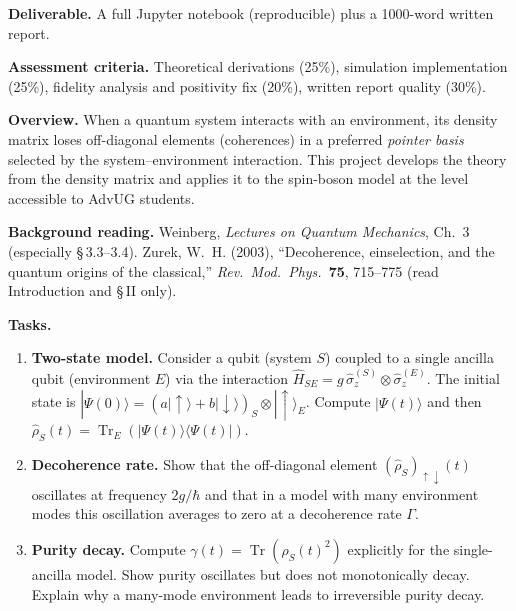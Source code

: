 \documentclass[11pt,a4paper]{article}
\begin{document}
\begin{tcolorbox}[ugprobbox, title={Project CJ1 --- Quantum State Tomography of a Qubit}]
\medskip\textbf{Deliverable.}
A full Jupyter notebook (reproducible) plus a 1000-word written report.

\medskip\textbf{Assessment criteria.}
Theoretical derivations (25\%), simulation implementation (25\%),
fidelity analysis and positivity fix (20\%), written report quality (30\%).
\end{tcolorbox}

\bigskip

\begin{tcolorbox}[ugprobbox, title={Project CJ2 --- Decoherence and the Pointer Basis}]

\textbf{Overview.}
When a quantum system interacts with an environment, its density matrix loses
off-diagonal elements (coherences) in a preferred \emph{pointer basis} selected
by the system--environment interaction.
This project develops the theory from the density matrix and applies it to
the spin-boson model at the level accessible to AdvUG students.

\medskip\textbf{Background reading.}
Weinberg, \textit{Lectures on Quantum Mechanics}, Ch.~3 (especially \S\,3.3--3.4).
Zurek, W.~H. (2003), ``Decoherence, einselection, and the quantum origins of the classical,''
\textit{Rev.\ Mod.\ Phys.}\ \textbf{75}, 715--775 (read Introduction and \S\,II only).

\medskip\textbf{Tasks.}
\begin{enumerate}[leftmargin=1.8em, label=\textbf{\arabic*.}, itemsep=8pt]
  \item \textbf{Two-state model.}
        Consider a qubit (system $S$) coupled to a single ancilla qubit (environment $E$)
        via the interaction
        $\hat{H}_{SE}=g\,\hat{\sigma}_z^{(S)}\otimes\hat{\sigma}_z^{(E)}$.
        The initial state is
        $|\Psi(0)\rangle=(a|\uparrow\rangle+b|\downarrow\rangle)_S\otimes|\uparrow\rangle_E$.
        Compute $|\Psi(t)\rangle$ and then $\hat{\rho}_S(t)=\operatorname{Tr}_E(|\Psi(t)\rangle\langle\Psi(t)|)$.

  \item \textbf{Decoherence rate.}
        Show that the off-diagonal element $(\hat{\rho}_S)_{\uparrow\downarrow}(t)$
        oscillates at frequency $2g/\hbar$ and that in a model with many environment
        modes this oscillation averages to zero at a decoherence rate $\Gamma$.

  \item \textbf{Purity decay.}
        Compute $\gamma(t)=\operatorname{Tr}(\hat{\rho}_S(t)^2)$ explicitly for the
        single-ancilla model. Show purity oscillates but does not monotonically decay.
        Explain why a many-mode environment leads to irreversible purity decay.


\end{enumerate}
\end{tcolorbox}
\end{document}
